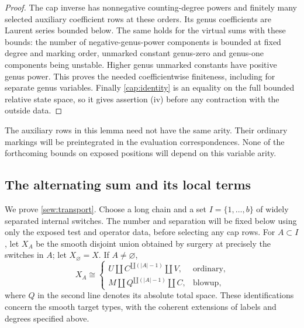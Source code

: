 \begin{proof}
The cap inverse has nonnegative counting-degree powers and finitely
many selected auxiliary coefficient rows at these orders.  Its genus
coefficients are Laurent series bounded below.  The same holds for
the virtual sums with these bounds: the number of negative-genus-power
components is bounded at fixed degree and marking order, unmarked
constant genus-zero and genus-one components being unstable.  Higher
genus unmarked constants have positive genus power.  This proves the
needed coefficientwise finiteness, including for separate genus
variables.  Finally \cref{cap:identity} is an equality on the full
bounded relative state space, so it gives assertion (iv) before any
contraction with the outside data.
\end{proof}

The auxiliary rows in this lemma need not have the same arity.  Their
ordinary markings will be preintegrated in the evaluation
correspondences.  None of the forthcoming bounds on exposed positions
will depend on this variable arity.

\subsection{The alternating sum and its local terms}

We prove \cref{sew:transport}.  Choose a long chain and a set
$I=\{1,\ldots,b\}$ of widely separated internal switches.  The number
and separation will be fixed below using only the exposed test and
operator data, before selecting any cap rows.  For $A\subset I$, let
$X_A$ be the smooth disjoint union obtained by surgery at precisely
the switches in $A$; let $X_{\varnothing}=X$.  If $A\ne\varnothing$,
\begin{equation}\label{sew:short-unions}
 X_A\cong
 \begin{cases}
 U\amalg C^{\amalg(|A|-1)}\amalg V,&\text{ordinary},\\
 M\amalg Q^{\amalg(|A|-1)}\amalg C,&\text{blowup},
 \end{cases}
\end{equation}
where $Q$ in the second line denotes its absolute total space.
These identifications concern the smooth target types, with the
coherent extensions of labels and degrees specified above.

